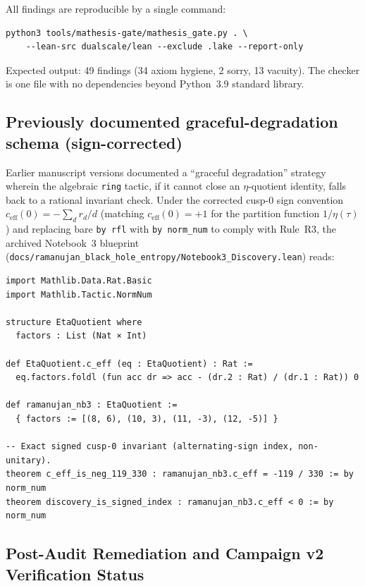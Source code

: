 All findings are reproducible by a single command:
\begin{verbatim}
python3 tools/mathesis-gate/mathesis_gate.py . \
    --lean-src dualscale/lean --exclude .lake --report-only
\end{verbatim}
Expected output: 49 findings (34 axiom hygiene, 2 sorry, 13 vacuity).
The checker is one file with no dependencies beyond Python~3.9 standard
library.

\subsection*{Previously documented graceful-degradation schema (sign-corrected)}

Earlier manuscript versions documented a ``graceful degradation'' strategy
wherein the algebraic \texttt{ring} tactic, if it cannot close an
$\eta$-quotient identity, falls back to a rational invariant check.
Under the corrected cusp-$0$ sign convention
$c_{\text{eff}}(0) = -\sum_d r_d/d$ (matching $c_{\text{eff}}(0)=+1$ for
the partition function $1/\eta(\tau)$) and replacing bare \texttt{by rfl}
with \texttt{by norm\_num} to comply with Rule~R3, the archived Notebook~3
blueprint (\texttt{docs/ramanujan\_black\_hole\_entropy/Notebook3\_Discovery.lean})
reads:

\begin{lstlisting}[caption={Exact rational invariant verified by kernel arithmetic
  under the corrected $c_{\text{eff}}(0) = -\sum r_d/d$ sign convention
  (no \texttt{sorry}, no \texttt{axiom})}]
import Mathlib.Data.Rat.Basic
import Mathlib.Tactic.NormNum

structure EtaQuotient where
  factors : List (Nat × Int)

def EtaQuotient.c_eff (eq : EtaQuotient) : Rat :=
  eq.factors.foldl (fun acc dr => acc - (dr.2 : Rat) / (dr.1 : Rat)) 0

def ramanujan_nb3 : EtaQuotient :=
  { factors := [(8, 6), (10, 3), (11, -3), (12, -5)] }

-- Exact signed cusp-0 invariant (alternating-sign index, non-unitary).
theorem c_eff_is_neg_119_330 : ramanujan_nb3.c_eff = -119 / 330 := by norm_num
theorem discovery_is_signed_index : ramanujan_nb3.c_eff < 0 := by norm_num
\end{lstlisting}

\subsection*{Post-Audit Remediation and Campaign v2 Verification Status}

